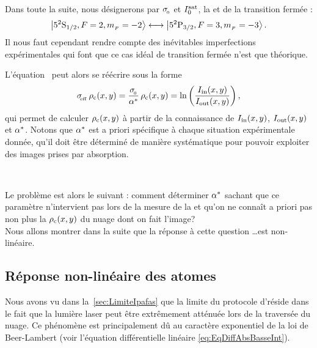 Dans toute la suite, nous désignerons par ${\sigma_{_{\hspace{-1pt}{0}}}}$ et ${I^{\rm sat}_{0}}$, la \seff et \lintsat de la transition fermée :
\[
{{\left| {{5^2 {\rm S}_{{1}/{2}}}, {F=2 , {m_{_F}}=-2} } \right\rangle}}\longleftrightarrow{{\left| {{\ensuremath{5^2 {\rm P}_{{3}/{2}}}}, {F=3 , {m_{_F}}=-3} } \right\rangle}}
\, .
\]
Il nous faut cependant rendre compte des inévitables imperfections expérimentales qui font que ce cas idéal de transition fermée n'est que théorique. 
%
%
%
%
%
%
%

\noindent
L'équation~ peut alors se réécrire sous la forme
\[
	{\sigma_{_{\hspace{-2pt}{\rm eff}}}} \, {{{\rho_{\rm{c}}}}(x,y)} = \frac{{\sigma_{_{\hspace{-1pt}{0}}}}}{{{\alpha}^{*}}} \, {{{\rho_{\rm{c}}}}(x,y)} 
	= 	{\ln\left(	\frac{{{{I}_{\rm in}}(x,y)}}{{{{I}_{\rm out}}(x,y)}}	\right)}
\, ,
\]
qui permet de calculer ${{{\rho_{\rm{c}}}}(x,y)}$ à partir de la connaissance de ${{{I}_{\rm in}}(x,y)}$, ${{{I}_{\rm out}}(x,y)}$ et ${{\alpha}^{*}}$.
Notons que ${{\alpha}^{*}}$ est a priori spécifique à chaque situation expérimentale donnée, \cad qu'il doit être déterminé de manière systématique pour pouvoir exploiter des images prises par absorption.

~

Le problème est alors le suivant : 
\noindent comment déterminer ${{\alpha}^{*}}$ sachant que ce paramètre n'intervient pas lors de la mesure de la \do et qu'on ne connaît a priori pas non plus la \dcol ${{\rho_{\rm{c}}}}(x,y)$ du nuage dont on fait l'image?\\
Nous allons montrer dans la suite que la réponse à cette question \ldots est non-linéaire.

\subsection{Réponse non-linéaire des atomes}
Nous avons vu dans la~\autoref{sec:LimiteIpafas} que la limite du protocole d'\ipafas réside dans le fait que la lumière laser peut être extrêmement atténuée lors de la traversée du nuage. Ce phénomène est principalement dû au caractère exponentiel de la loi de Beer-Lambert (voir l'équation différentielle linéaire \vref{eq:EqDiffAbsBasseInt}). 

